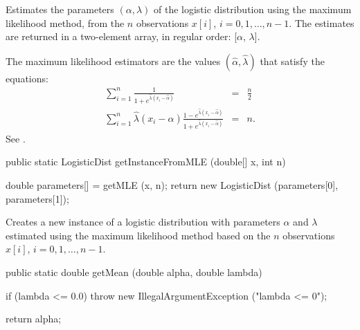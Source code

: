 \begin{tabb}
   Estimates the parameters $(\alpha, \lambda)$ of the logistic distribution
   using the maximum likelihood method, from the $n$ observations
   $x[i]$, $i = 0, 1,\ldots, n-1$. The estimates are returned in a two-element
    array, in regular order: [$\alpha$, $\lambda$].
   \begin{detailed}
   The maximum likelihood estimators are the values $(\hat\alpha, \hat\lambda)$
   that satisfy the equations:
   \begin{eqnarray*}
      \sum_{i=1}^{n} \frac1{1 + e^{\hat{\lambda} (x_i - \hat{\alpha})}} & = &
             \frac{n}{2}\\[6pt]
      \sum_{i=1}^{n} \hat{\lambda} (x_i - \hat{\alpha}) \frac{1 - e^{\hat{\lambda}
      (x_i - \hat{\alpha})}}{1 + e^{\hat{\lambda} (x_i - \hat{\alpha})}} & = & n.
   \end{eqnarray*}
 See \cite[page 128]{mEVA00a}.
   \end{detailed}
\end{tabb}
\begin{htmlonly}
\end{htmlonly}
\begin{code}

   public static LogisticDist getInstanceFromMLE (double[] x, int n)\begin{hide} {
      double parameters[] = getMLE (x, n);
      return new LogisticDist (parameters[0], parameters[1]);
   }\end{hide}
\end{code}
\begin{tabb}
   Creates a new instance of a logistic distribution with parameters $\alpha$
   and $\lambda$
   estimated using the maximum likelihood method based on the $n$ observations
   $x[i]$, $i = 0, 1, \ldots, n-1$.
\end{tabb}
\begin{htmlonly}
\end{htmlonly}
\begin{code}

   public static double getMean (double alpha, double lambda)\begin{hide} {
      if (lambda <= 0.0)
         throw new IllegalArgumentException ("lambda <= 0");

      return alpha;
   }\end{hide}
\end{code}
